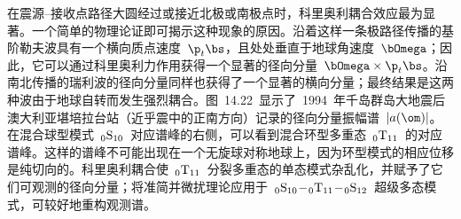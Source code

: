 \addtocounter{figure}{1}

在震源--接收点路径大圆经过或接近北极或南极点时，科里奥利耦合效应最为显著。一个简单的物理论证即可揭示这种现象的原因。沿着这样一条极路径传播的基阶勒夫波具有一个横向质点速度~$\p_t\bs$，且处处垂直于地球角速度~$\bOmega$；因此，它可以通过科里奥利力作用获得一个显著的径向分量~$\bOmega\times\p_t\bs$。沿南北传播的瑞利波的径向分量同样也获得了一个显著的横向分量；最终结果是这两种波由于地球自转而发生强烈耦合。图~14.22~显示了~1994~年千岛群岛大地震后澳大利亚堪培拉台站（近乎震中的正南方向）记录的径向分量振幅谱~$|a(\om)|$。在混合球型模式~${}_0{\rm S}_{10}$~对应谱峰的右侧，可以看到混合环型多重态~${}_0{\rm T}_{11}$~的对应谱峰。这样的谱峰不可能出现在一个无旋球对称地球上，因为环型模式的相应位移是纯切向的。科里奥利耦合使~${}_0{\rm T}_{11}$~分裂多重态的单态模式杂乱化，并赋予了它们可观测的径向分量；将准简并微扰理论应用于~${}_{0}{\rm S}_{10}\!-\!{}_0{\rm T}_{11}\!-\!{}_{0}{\rm S}_{12}$~超级多态模式，可较好地重构观测谱。
%
%

